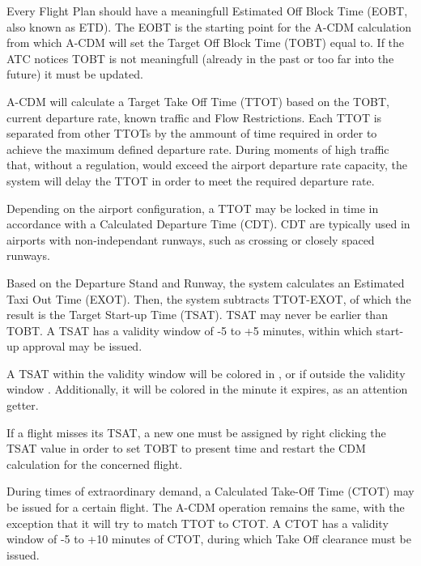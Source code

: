 \documentclass[a4paper,oneside,11pt]{memoir}
\begin{document}
\medskip

Every Flight Plan should have a meaningfull Estimated Off Block Time (EOBT, also known as ETD). The EOBT is the starting point for the A-CDM calculation from which A-CDM will set the Target Off Block Time (TOBT) equal to. If the ATC notices TOBT is not meaningfull (already in the past or too far into the future) it must be updated.

\medskip

A-CDM will calculate a Target Take Off Time (TTOT) based on the TOBT, current departure rate, known traffic and Flow Restrictions. Each TTOT is separated from other TTOTs by the ammount of time required in order to achieve the maximum defined departure rate. During moments of high traffic that, without a regulation, would exceed the airport departure rate capacity, the system will delay the TTOT in order to meet the required departure rate. 

\medskip

Depending on the airport configuration, a TTOT may be locked in time in accordance with a Calculated Departure Time (CDT). CDT are typically used in airports with non-independant runways, such as crossing or closely spaced runways.


\medskip

Based on the Departure Stand and Runway, the system calculates an Estimated Taxi Out Time (EXOT). Then, the system subtracts TTOT-EXOT, of which the result is the Target Start-up Time (TSAT). TSAT may never be earlier than TOBT. A TSAT has a validity window of -5 to +5 minutes, within which start-up approval may be issued. 

A TSAT within the validity window will be colored in , or if outside the validity window . Additionally, it will be colored in  the minute it expires, as an attention getter.

If a flight misses its TSAT, a new one must be assigned by right clicking the TSAT value in order to set TOBT to present time and restart the CDM calculation for the concerned flight.

\medskip

During times of extraordinary demand, a Calculated Take-Off Time (CTOT) may be issued for a certain flight. The A-CDM operation remains the same, with the exception that it will try to match TTOT to CTOT. A CTOT has a validity window of -5 to +10 minutes of CTOT, during which Take Off clearance must be issued.
\end{document}
